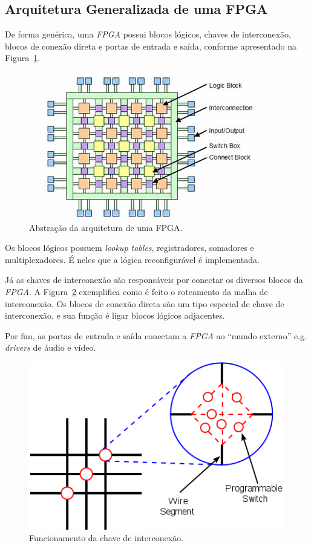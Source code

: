     \subsection{Arquitetura Generalizada de uma FPGA}
    {
        De forma genérica, uma \textit{FPGA} possui blocos lógicos, chaves de
        interconexão, blocos de conexão direta e portas de entrada e saída,
        conforme apresentado na Figura~\ref{fig:fpga_general_arch}.
    }

    \begin{figure}[H]
    \centering
    \includegraphics[width=.7\linewidth]
        {../images/fpga_architecture_abstraction_-_olin_college.jpg}
        \caption[Abstração da arquitetura de uma FPGA]
            {Abstração da arquitetura de uma FPGA.~\cite{fpga_arch_abstraction}}
        \label{fig:fpga_general_arch}
    \end{figure}

    {
        Os blocos lógicos possuem \textit{lookup tables}, registradores, somadores
        e multiplexadores. É neles que a lógica reconfigurável é implementada.
    }

    {
        Já as chaves de interconexão são responsáveis por conectar os diversos
        blocos da \textit{FPGA}. A Figura~\ref{fig:fpga_switch_box} exemplifica
        como é feito o roteamento da malha de interconexão. Os blocos de conexão
        direta são um tipo especial de chave de interconexão, e sua função é ligar
        blocos lógicos adjacentes.
    }

    {
        Por fim, as portas de entrada e saída conectam a \textit{FPGA} ao ``mundo
        externo'' e.g. \textit{drivers} de áudio e vídeo.
    }

    \begin{figure}[H]
    \centering
    \includegraphics[width=.5\linewidth]
        {../images/switch_box_wikimedia.png}
        \caption[Funcionamento da chave de interconexão]
            {Funcionamento da chave de interconexão.~\cite{fpga_switch_box}}
        \label{fig:fpga_switch_box}
    \end{figure}



